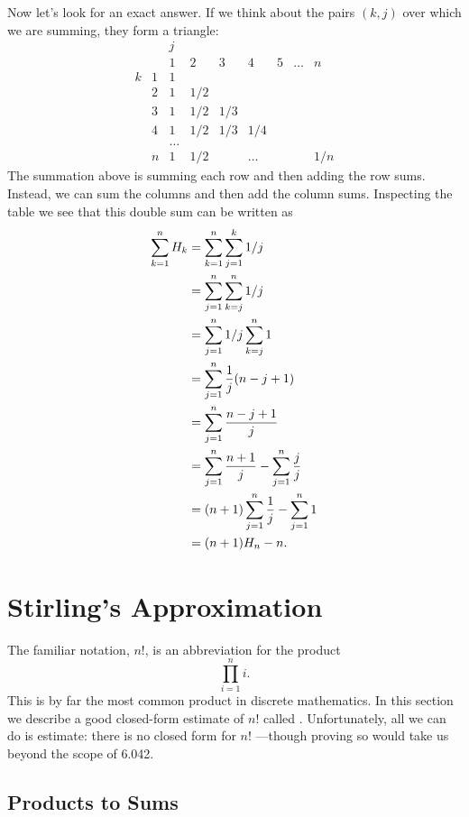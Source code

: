 Now let's look for an exact answer.  If we think about the pairs
$(k,j)$ over which we are summing, they form a triangle:
\[
\begin{array}{cc|ccccccc}
 &  & j &   &   &   &   &       &   \\
 &  & 1 & 2 & 3 & 4 & 5 & \dots & n \\
\hline
k & 1 & 1\\
  & 2 &1&1/2\\
  & 3 &1&1/2&1/3\\
  & 4 &1&1/2&1/3&1/4\\
  &   &\dots\\
  & n &1&1/2&&\dots&&&1/n
\end{array}
\]
The summation above is summing each row and then adding the row sums.
Instead, we can sum the columns and then add the column sums.
Inspecting the table we see that this double sum can be written as
\begin{align}
\sum_{k=1}^n H_k &= \sum_{k=1}^n \sum_{j=1}^k 1/j\notag\\
&= \sum_{j=1}^n \sum_{k=j}^n 1/j\notag\\
&= \sum_{j=1}^n 1/j \sum_{k=j}^n 1\notag\\
&= \sum_{j=1}^n \frac1j (n-j+1)\notag\\
&= \sum_{j=1}^n \frac{n-j+1}j \notag\\
&= \sum_{j=1}^n \frac{n+1}j - \sum_{j=1}^n \frac{j}{j}\notag\\
&= (n+1)\sum_{j=1}^n \frac1j - \sum_{j=1}^n 1\notag\\
&= (n+1)H_n-n.\label{sHk}
\end{align}

\section{Stirling's Approximation}\label{Stirling_sec}

The familiar  notation, $n!$, is an abbreviation for the
product
\[
\prod_{i=1}^n i.
\]
This is by far the most common product in discrete mathematics.  In this
section we describe a good closed-form estimate of $n!$ called
.  Unfortunately, all we can do is
estimate: there is no closed form for $n!$ ---though proving so would take
us beyond the scope of 6.042.

\subsection{Products to Sums}

